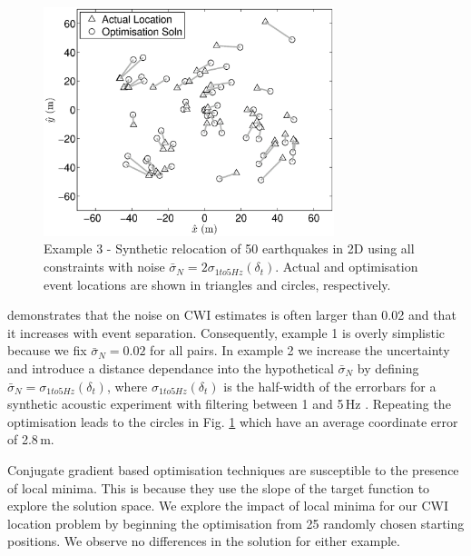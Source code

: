 \documentclass[extra]{gji}
\begin{document}
\begin{figure}
\includegraphics[width = 20pc]{diags/locs_2D_50eq_3.eps}
\caption{Example 3 - Synthetic relocation of 50 earthquakes in 2D using all constraints with noise
$\bar{\sigma}_N= 2 \sigma_{1to5Hz}(\delta_t)$.
 Actual and optimisation event locations
are shown in triangles and circles, respectively.}
\label{fig-2D50eq-relocation_eg3}
\end{figure}
\citet{dr_Robinson11a} demonstrates that the noise on CWI estimates
is often larger than 0.02 and that it increases with event
separation. Consequently, example 1 is overly simplistic because we
fix $\bar{\sigma}_N=0.02$ for all pairs. In example 2 we increase
the uncertainty and introduce a distance dependance into the
hypothetical $\bar{\sigma}_N$ by defining
$\bar{\sigma}_N=\sigma_{1to5Hz}(\delta_t)$, where
$\sigma_{1to5Hz}(\delta_t)$ is the half-width of the errorbars for a
synthetic acoustic experiment with filtering between 1 and 5\,Hz
\citep[see Fig4(b) of ][]{dr_Robinson11a}. Repeating the
optimisation leads to the circles in Fig.
\ref{fig-2D50eq-relocation_eg3} which have an average coordinate
error of 2.8\,m.

Conjugate gradient based optimisation techniques are susceptible to
the presence of local minima. This is because they use the slope of
the target function to explore the solution space. We explore the
impact of local minima for our CWI location problem by beginning the
optimisation from 25 randomly chosen starting positions. We observe
no differences in the solution for either example.
\end{document}
